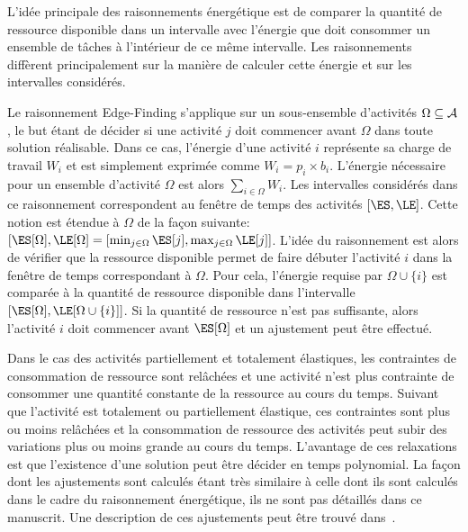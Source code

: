 L'idée principale des raisonnements énergétique est de comparer la
quantité de ressource disponible dans un intervalle avec l'énergie que
doit consommer un ensemble de tâches à l'intérieur de ce même
intervalle. Les raisonnements diffèrent principalement sur la manière
de calculer cette énergie et sur les intervalles considérés. 

 Le raisonnement Edge-Finding s'applique sur un sous-ensemble
d'activités $\Omega \subseteq {\cal A}$, le but étant de décider si une
activité $j$ doit commencer avant $\Omega$ dans toute solution
réalisable. Dans ce cas, l'énergie d'une activité $i$ représente sa
charge de travail $W_i$ et est simplement exprimée comme
$W_i=p_i\times b_i$. L'énergie nécessaire pour un ensemble d'activité
$\Omega$ est alors $\sum_{i\in \Omega} W_i$. Les intervalles
considérés dans ce raisonnement correspondent au fenêtre de temps des
activités $[\ES,\LE]$. Cette notion est étendue à $\Omega$ de la façon
suivante: $[\ES[\Omega],\LE[\Omega]=[\min_{j \in \Omega}\ES[j],\max_{j
\in \Omega} \LE[j] ]$. L'idée du raisonnement est alors  de vérifier
que la ressource disponible permet de faire débuter l'activité $i$
dans la fenêtre de temps correspondant à $\Omega$. Pour cela,
l'énergie requise par $\Omega \cup \{ i\}$ est comparée à la quantité
de ressource disponible dans l'intervalle $[\ES[\Omega],\LE[\Omega\cup
\{i\}]]$. Si la quantité de ressource n'est pas suffisante, alors
l'activité $i$ doit commencer avant $\ES[\Omega]$ et un ajustement
peut être effectué.

Dans le cas des activités partiellement et totalement élastiques, les
contraintes de consommation de ressource sont relâchées et une
activité n'est plus contrainte de consommer une quantité constante de
la ressource au cours du temps. Suivant que l'activité est totalement
ou partiellement élastique, ces contraintes sont plus ou moins
relâchées et la consommation de ressource des activités peut subir des
variations plus ou moins grande au cours du temps. L'avantage de ces
relaxations est que l'existence d'une solution peut être décider en
temps polynomial. La façon dont les ajustements sont calculés étant
très similaire à celle dont ils sont calculés dans le cadre du
raisonnement énergétique, ils ne sont pas détaillés dans ce
manuscrit. Une description de ces ajustements peut être trouvé
dans~\cite{BLN}. 

